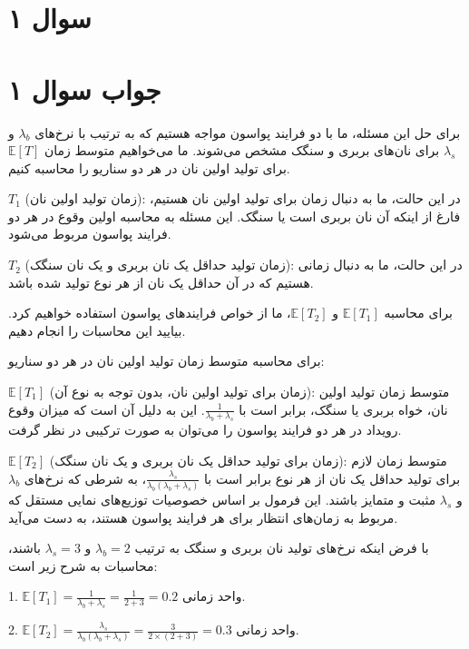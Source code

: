 \section*{سوال ۱}



\section*{جواب سوال ۱}

برای حل این مسئله، ما با دو فرایند پواسون مواجه هستیم که به ترتیب با نرخ‌های \( \lambda_b \) و \( \lambda_s \) برای نان‌های بربری و سنگک مشخص می‌شوند. ما می‌خواهیم متوسط زمان \( \mathbb{E}[T] \) برای تولید اولین نان در هر دو سناریو را محاسبه کنیم.

\( T_1 \) (زمان تولید اولین نان): در این حالت، ما به دنبال زمان برای تولید اولین نان هستیم، فارغ از اینکه آن نان بربری است یا سنگک. این مسئله به محاسبه اولین وقوع در هر دو فرایند پواسون مربوط می‌شود.

\( T_2 \) (زمان تولید حداقل یک نان بربری و یک نان سنگک): در این حالت، ما به دنبال زمانی هستیم که در آن حداقل یک نان از هر نوع تولید شده باشد.

برای محاسبه \( \mathbb{E}[T_1] \) و \( \mathbb{E}[T_2] \)، ما از خواص فرایندهای پواسون استفاده خواهیم کرد. بیایید این محاسبات را انجام دهیم.

برای محاسبه متوسط زمان تولید اولین نان در هر دو سناریو:

\( \mathbb{E}[T_1] \) (زمان برای تولید اولین نان، بدون توجه به نوع آن): متوسط زمان تولید اولین نان، خواه بربری یا سنگک، برابر است با \( \frac{1}{\lambda_b + \lambda_s} \). این به دلیل آن است که میزان وقوع رویداد در هر دو فرایند پواسون را می‌توان به صورت ترکیبی در نظر گرفت.

\( \mathbb{E}[T_2] \) (زمان برای تولید حداقل یک نان بربری و یک نان سنگک): متوسط زمان لازم برای تولید حداقل یک نان از هر نوع برابر است با \( \frac{\lambda_s}{\lambda_b(\lambda_b + \lambda_s)} \)، به شرطی که نرخ‌های \( \lambda_b \) و \( \lambda_s \) مثبت و متمایز باشند. این فرمول بر اساس خصوصیات توزیع‌های نمایی مستقل که مربوط به زمان‌های انتظار برای هر فرایند پواسون هستند، به دست می‌آید.

با فرض اینکه نرخ‌های تولید نان بربری و سنگک به ترتیب \( \lambda_b = 2 \) و \( \lambda_s = 3 \) باشند، محاسبات به شرح زیر است:

1. \( \mathbb{E}[T_1] = \frac{1}{\lambda_b + \lambda_s} = \frac{1}{2 + 3} = 0.2 \) واحد زمانی.

2. \( \mathbb{E}[T_2] = \frac{\lambda_s}{\lambda_b(\lambda_b + \lambda_s)} = \frac{3}{2 \times (2 + 3)} = 0.3 \) واحد زمانی.